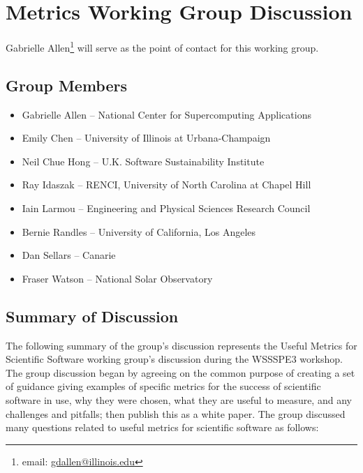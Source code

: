 \section{Metrics Working Group Discussion}
\label{sec:appendix_metrics}

Gabrielle Allen\footnote{email: \href{mailto:gdallen@illinois.edu}{gdallen@illinois.edu}} will serve as the point of contact for this working group.


\subsection{Group Members}

\begin{itemize}
\item Gabrielle Allen -- National Center for Supercomputing Applications
\item Emily Chen -- University of Illinois at Urbana-Champaign
\item Neil Chue Hong -- U.K. Software Sustainability Institute
\item Ray Idaszak -- RENCI, University of North Carolina at Chapel Hill
\item Iain Larmou -- Engineering and Physical Sciences Research Council
\item Bernie Randles -- University of California, Los Angeles
\item Dan Sellars -- Canarie
\item Fraser Watson -- National Solar Observatory
\end{itemize}

\subsection{Summary of Discussion}

The following summary of the group's discussion represents the Useful Metrics for Scientific Software working group's discussion during the WSSSPE3 workshop. The group discussion began by agreeing on the common purpose of creating a set of guidance giving examples of specific metrics for the success of scientific software in use, why they were chosen, what they are useful to measure, and any challenges and pitfalls; then publish this as a white paper.  The group discussed many questions related to useful metrics for scientific software as follows: 


